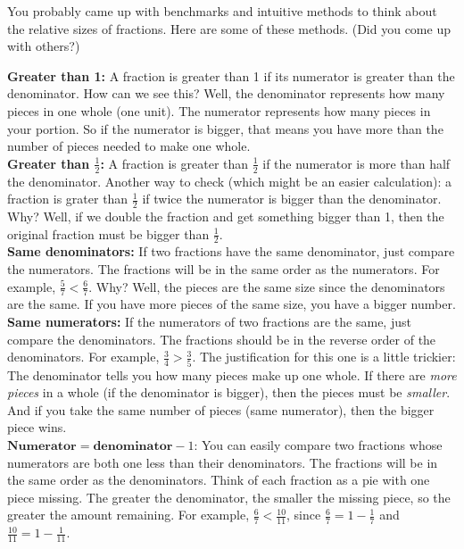 You probably came up with benchmarks and intuitive methods to think about the relative sizes of fractions.  Here are some of these methods.  (Did you come up with others?)



\noindent
{\bf Greater than 1:} A fraction is greater than 1 if its numerator is greater than the denominator.   How can we see this?  Well, the denominator represents how many pieces in one whole (one unit).  The numerator represents how many pieces in your portion. So if the numerator is bigger, that means you have more than the number of pieces needed to make one whole.   \\


\noindent
{\bf Greater than $\frac 12$:} A fraction is greater than $\frac 1 2$ if the numerator is more than half the denominator.  Another way to check (which might be an easier calculation): a fraction is grater than $\frac 1 2$ if twice the numerator is bigger than the denominator.  Why?  Well, if we double the fraction and get something bigger than 1, then the original fraction must be bigger than $\frac 1 2$.\\

\noindent
{\bf Same denominators:} If two fractions have the same denominator, just compare the numerators. The fractions will be in the same order as the numerators.  For example, $\frac 5 7 < \frac 6 7$.  Why?   Well, the pieces  are the same size since the denominators are the same.  If you have more pieces of the same size, you have a bigger number.   \\

\noindent
{\bf Same numerators: } If the numerators of two fractions are the same, just compare the denominators. The fractions should be in the reverse order of the denominators. For example, $\frac 3 4 > \frac 3 5$.  The justification for this one is a little trickier:  The denominator tells you how many pieces make up one whole.  If there are \emph{more pieces} in a whole (if the denominator is bigger), then the pieces must be \emph{smaller}.  And if you take the same number of pieces (same numerator), then the bigger piece wins.     \\

\noindent
$\textbf{Numerator} = \textbf{denominator} - 1$: You can easily compare two fractions whose numerators are both one less than their denominators. The fractions will be in the same order as the denominators.  Think of each fraction as a pie with one piece missing. The greater the denominator, the smaller the missing piece,  so the greater the amount remaining. For example, $\frac 6 7 < \frac{10}{11}$, since $\frac 6 7 = 1 - \frac 1 7$ and $\frac {10}{11} = 1 - \frac 1{11}$.   \\



